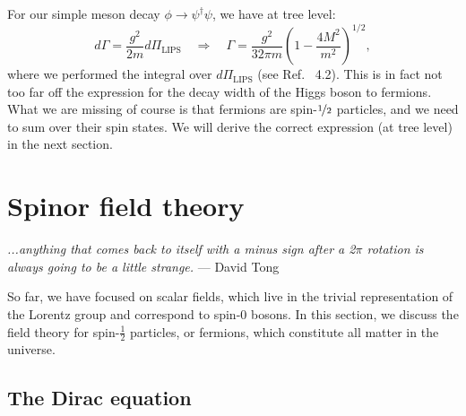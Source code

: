 For our simple meson decay $\phi \rightarrow \psi^\dagger\psi$, we have at tree level:
\begin{equation}
	\label{eq:01_qft_interactions_decay_rate_meson_decay}
	d\Gamma = \frac{g^2}{2m} d\Pi_{\mathrm{LIPS}} \quad \Rightarrow \quad \Gamma = \frac{g^2}{32\pi m} \left(1 - \frac{4M^2}{m^2}\right)^{1/2},
\end{equation}
where we performed the integral over $d\Pi_{\mathrm{LIPS}}$ (see Ref.~\cite{XianyuPSSolutions} 4.2).
This is in fact not too far off the expression for the decay width of the Higgs boson to fermions.
What we are missing of course is that fermions are spin-$\cnicefrac{1}{2}$ particles, and we need to sum over their spin states.
We will derive the correct expression (at tree level) in the next section.

\section{Spinor field theory}
\label{sec:01_qft_spinors}

\begin{center}
	\centering
	\noindent
	\textit{...anything that comes back to itself with a minus sign after a 2$\pi$ rotation is always going to be a little strange.} --- David Tong~\cite{TongSM}
\end{center}

So far, we have focused on scalar fields, which live in the trivial representation of the Lorentz group and correspond to spin-$0$ bosons.
In this section, we discuss the field theory for spin-$\frac{1}{2}$ particles, or fermions, which constitute all matter in the universe.

\subsection{The Dirac equation}
\label{sec:01_qft_spinors_dirac}

